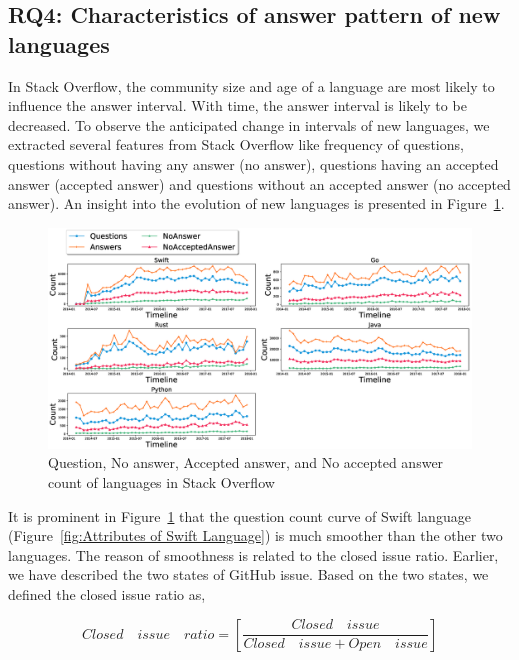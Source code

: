 \subsection{RQ4: Characteristics of answer pattern of new languages}
\label{RQ3}
In Stack Overflow, the community size and age of a language are most likely to influence the answer interval. With time, the answer interval is likely to be decreased. To observe the anticipated change in intervals of new languages, we extracted several features from Stack Overflow like frequency of questions, questions without having any answer (no answer), questions having an accepted answer (accepted answer) and questions without an accepted answer (no accepted answer). An insight into the evolution of new languages is presented in Figure~\ref{fig:Evolution of new languages}.

\begin{figure}[htbp]

\includegraphics[scale=0.28]{figures/Evolution.eps} 
\caption{Question, No answer, Accepted answer, and No accepted answer count of languages in Stack Overflow}
\label{fig:Evolution of new languages}
\end{figure}

\iffalse
It is prominent in Figure~\ref{fig:Evolution of new languages} that the question count curve of Swift language (Figure~\ref{fig:Attributes of Swift Language}) is much smoother than the other two languages. The reason of smoothness is related to the closed issue ratio. Earlier, we have described the two states of GitHub issue. Based on the two states, we defined the closed issue ratio as,

\begin{equation}
{Closed \quad issue \quad ratio=}
\left[\dfrac{Closed\quad issue}
{Closed\quad issue+Open\quad issue}\right]
\label{eq:Closed Issue Ratio}
\end{equation}


